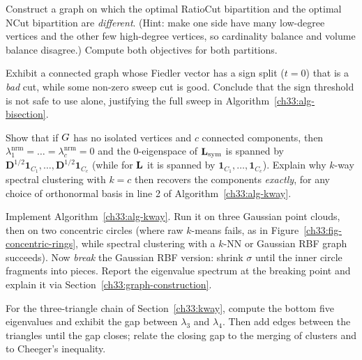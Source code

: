 \begin{exercise}
Construct a graph on which the optimal RatioCut bipartition and the optimal NCut bipartition are
\emph{different}. (Hint: make one side have many low-degree vertices and the other few high-degree vertices,
so cardinality balance and volume balance disagree.) Compute both objectives for both partitions.
\end{exercise}

\begin{exercise}
Exhibit a connected graph whose Fiedler vector has a sign split ($t=0$) that is a \emph{bad} cut, while some
non-zero sweep cut is good. Conclude that the sign threshold is not
safe to use alone, justifying the full sweep in Algorithm~\ref{ch33:alg-bisection}.
\end{exercise}

\begin{exercise}[Disconnected $=$ degenerate]
Show that if $G$ has no isolated vertices and $c$ connected components, then $\lambda_1^{\mathrm{nrm}}=\dots=\lambda_c^{\mathrm{nrm}}=0$ and the
$0$-eigenspace of $\mathbf{L}_{\mathrm{sym}}$ is spanned by $\mathbf{D}^{1/2}\mathbf{1}_{C_1},\dots,\mathbf{D}^{1/2}\mathbf{1}_{C_c}$ (while for $\mathbf{L}$ it is spanned by $\mathbf{1}_{C_1},\dots,\mathbf{1}_{C_c}$). Explain why $k$-way spectral clustering with $k=c$ then
recovers the components \emph{exactly}, for any choice of orthonormal basis in line 2 of
Algorithm~\ref{ch33:alg-kway}.
\end{exercise}

\begin{exercise}
Implement Algorithm~\ref{ch33:alg-kway}. Run it on three Gaussian point clouds, then on two concentric
circles (where raw $k$-means fails, as in Figure~\ref{ch33:fig-concentric-rings}, while spectral clustering with a $k$-NN or Gaussian RBF graph
succeeds). Now \emph{break} the Gaussian RBF version: shrink $\sigma$ until the inner circle fragments into pieces. Report the eigenvalue
spectrum at the breaking point and explain it via Section~\ref{ch33:graph-construction}.
\end{exercise}

\begin{exercise}
For the three-triangle chain of Section~\ref{ch33:kway}, compute the bottom five eigenvalues and exhibit the
gap between $\lambda_3$ and $\lambda_4$. Then add edges between the triangles until the gap closes; relate
the closing gap to the merging of clusters and to Cheeger's inequality.
\end{exercise}


